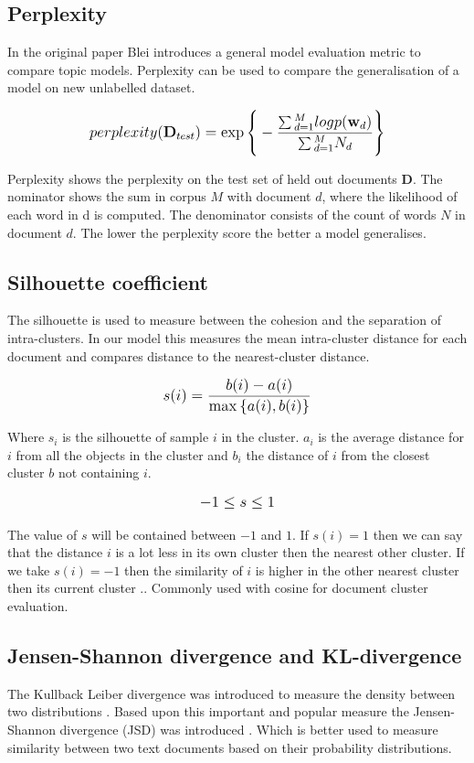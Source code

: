 \subsection{Perplexity}\label{methodology:perplexity}
In the original paper Blei introduces a general model evaluation metric \cite{Blei2003} to compare topic models. Perplexity can be used to compare the generalisation of a model on new unlabelled dataset.

\[
   \mathlarger{perplexity(\textbf{D}_{test}) = \exp{\Bigg \{ -\frac{\sum{}_{d=1}^{M}logp(\textbf{w}_d)}{\sum{}_{d=1}^{M}N_d} \Bigg \}}}
\]

Perplexity shows the perplexity on the test set of held out documents $\textbf{D}$. The nominator shows the sum in  corpus $M$ with document $d$, where the likelihood of each word in d is computed. The denominator consists of the count of words $N$ in document $d$.
The lower the perplexity score the better a model generalises.


\subsection{Silhouette coefficient} \label{methodology:silhouette}
The silhouette is used to measure between the cohesion and the separation of intra-clusters. In our model this measures the mean intra-cluster distance for each document and compares distance to the nearest-cluster distance.

\[
   \mathlarger{s(i) = \frac{b(i) - a(i)}{\max{\{ a(i), b(i)}\} } }
\]

Where $s_i$ is the silhouette of sample $i$ in the cluster. $a_i$ is the average distance for $i$ from all the objects in the cluster and $b_i$ the distance of $i$ from the closest cluster $b$ not containing $i$. 

\[
\mathlarger{-1 \leq s \le 1}
\]

The value of $s$ will be contained between $-1$ and $1$. If $s(i) = 1$ then we can say that the distance $i$  is a lot less in its own cluster then the nearest other cluster. If we take $s(i) = -1$ then the similarity of $i$ is higher in the other nearest cluster then its current cluster \cite{Rousseeuw1987Silhouettes:Analysis}.. Commonly used with cosine for document cluster evaluation.


\subsection{Jensen-Shannon divergence and KL-divergence} \label{methodology:jsdivergence}
The Kullback Leiber divergence was introduced to measure the density between two distributions \cite{Hershey2007ApproximatingModels}. Based upon this important and popular measure the Jensen-Shannon divergence (JSD) was introduced \cite{Fuglede2004Jensen-ShannonEmbedding}. Which is better used to measure similarity between two text documents based on their probability distributions.

